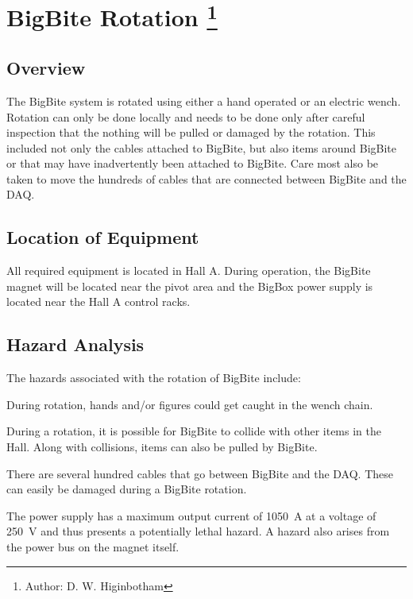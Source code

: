%
%

\chapter[BigBite Magnet]{BigBite Rotation 
\footnote{Author: D. W. Higinbotham }
}

\section{Overview}
The BigBite system is rotated using either a hand operated or an electric wench.
Rotation can only be done locally and needs to be done only after careful inspection that
the nothing will be pulled or damaged by the rotation.  This included not only the cables
attached to BigBite, but also items around BigBite or that may have inadvertently been attached 
to BigBite.  Care most also be taken to move the hundreds of cables that are connected between BigBite
and the DAQ.

\section{Location of Equipment}

All required equipment is located in Hall A.  During operation, the BigBite magnet 
will be located near the pivot area and the BigBox power supply is
located near the Hall A control racks.

\section{Hazard Analysis}

The hazards associated with the rotation of BigBite include:

During rotation, hands and/or figures could get caught in the wench chain. 

During a rotation, it is possible for BigBite to collide with other items in the Hall.
Along with collisions, items can also be pulled by BigBite.

There are several hundred cables that go between BigBite and the DAQ.  These can easily
be damaged during a BigBite rotation.

	The power supply has a maximum output current of 1050~A 
at a voltage of 250~V and thus presents a potentially lethal hazard.  
A hazard also arises from the power bus on the magnet itself. 

